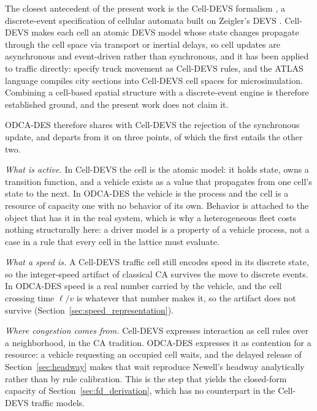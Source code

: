 \documentclass[review,authoryear]{elsarticle}
\begin{document}
The closest antecedent of the present work is the Cell-DEVS formalism \citep{wainer2001timed,wainer2014cellular}, a discrete-event specification of cellular automata built on Zeigler's DEVS \citep{zeigler2000theory}. Cell-DEVS makes each cell an atomic DEVS model whose state changes propagate through the cell space via transport or inertial delays, so cell updates are asynchronous and event-driven rather than synchronous, and it has been applied to traffic directly: \citet{davidson2000specifying} specify truck movement as Cell-DEVS rules, and the ATLAS language \citep{wainer2006atlas} compiles city sections into Cell-DEVS cell spaces for microsimulation. Combining a cell-based spatial structure with a discrete-event engine is therefore established ground, and the present work does not claim it.

ODCA-DES therefore shares with Cell-DEVS the rejection of the synchronous update, and departs from it on three points, of which the first entails the other two.

\emph{What is active.} In Cell-DEVS the cell is the atomic model: it holds state, owns a transition function, and a vehicle exists as a value that propagates from one cell's state to the next. In ODCA-DES the vehicle is the process and the cell is a resource of capacity one with no behavior of its own. Behavior is attached to the object that has it in the real system, which is why a heterogeneous fleet costs nothing structurally here: a driver model is a property of a vehicle process, not a case in a rule that every cell in the lattice must evaluate.

\emph{What a speed is.} A Cell-DEVS traffic cell still encodes speed in its discrete state, so the integer-speed artifact of classical CA survives the move to discrete events. In ODCA-DES speed is a real number carried by the vehicle, and the cell crossing time $\ell/v$ is whatever that number makes it, so the artifact does not survive (Section~\ref{sec:speed_representation}).

\emph{Where congestion comes from.} Cell-DEVS expresses interaction as cell rules over a neighborhood, in the CA tradition. ODCA-DES expresses it as contention for a resource: a vehicle requesting an occupied cell waits, and the delayed release of Section~\ref{sec:headway} makes that wait reproduce Newell's headway analytically rather than by rule calibration. This is the step that yields the closed-form capacity of Section~\ref{sec:fd_derivation}, which has no counterpart in the Cell-DEVS traffic models.
\end{document}
